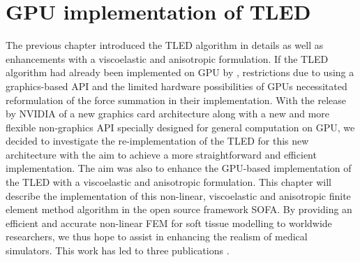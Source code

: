 \chapter{GPU implementation of TLED}
\label{chap6}
\begin{shortAbstract}
The previous chapter introduced the TLED algorithm in details as well as enhancements with a viscoelastic and anisotropic formulation. If the TLED algorithm had already been implemented on GPU by \cite{Taylor07b}, restrictions due to using a graphics-based API and the limited hardware possibilities of GPUs necessitated reformulation of the force summation in their implementation. With the release by NVIDIA of a new graphics card architecture along with a new and more flexible non-graphics API specially designed for general computation on GPU, we decided to investigate the re-implementation of the TLED for this new architecture with the aim to achieve a more straightforward and efficient implementation. The aim was also to enhance the GPU-based implementation of the TLED with a viscoelastic and anisotropic formulation. This chapter will describe the implementation of this non-linear, viscoelastic and anisotropic finite element method algorithm in the open source framework SOFA. By providing an efficient and accurate non-linear FEM for soft tissue modelling to worldwide researchers, we thus hope to assist in enhancing the realism of medical simulators. This work has led to three publications \citep{Comas2008,Taylor2008,Taylor2009}.
\end{shortAbstract}

